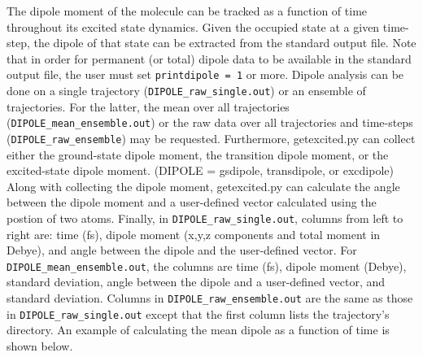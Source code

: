 \documentclass[letterpaper,12pt,titlepage]{article}
\begin{document}
The dipole moment of the molecule can be tracked as a function of time throughout its excited state dynamics.  Given the occupied state at a given time-step, the dipole of that state can be extracted from the standard output file.  Note that in order for permanent (or total) dipole data to be available in the standard output file, the user must set \verb+printdipole = 1+ or more.  Dipole analysis can be done on a single trajectory (\verb+DIPOLE_raw_single.out+) or an ensemble of trajectories.  For the latter, the mean over all trajectories (\verb+DIPOLE_mean_ensemble.out+) or the raw data over all trajectories and time-steps (\verb+DIPOLE_raw_ensemble+) may be requested.  Furthermore, getexcited.py can collect either the ground-state dipole moment, the transition dipole moment, or the excited-state dipole moment. (DIPOLE = gsdipole, transdipole, or excdipole)  Along with collecting the dipole moment, getexcited.py can calculate the angle between the dipole moment and a user-defined vector calculated using the postion of two atoms.  Finally, in \verb+DIPOLE_raw_single.out+, columns from left to right are: time (fs), dipole moment (x,y,z components and total moment in Debye), and angle between the dipole and the user-defined vector.  For \verb+DIPOLE_mean_ensemble.out+, the columns are time (fs), dipole moment (Debye), standard deviation, angle between the dipole and a user-defined vector, and standard deviation.  Columns in \verb+DIPOLE_raw_ensemble.out+ are the same as those in \verb+DIPOLE_raw_single.out+ except that the first column lists the trajectory's directory.  An example of calculating the mean dipole as a function of time is shown below.
\end{document}
